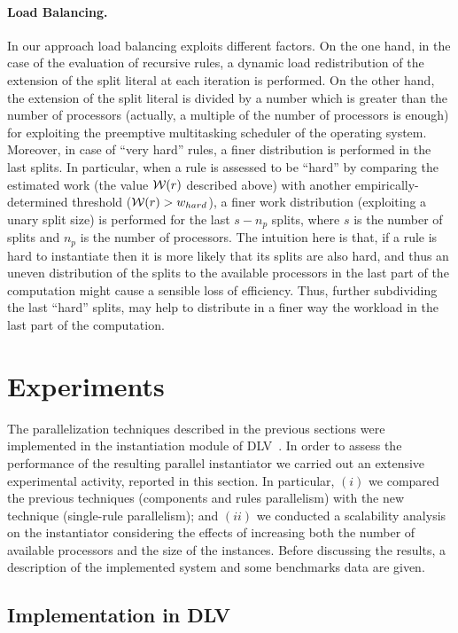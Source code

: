 \documentclass[preprint]{tlp}
\newcommand{\dlv}{{\sc DLV}\xspace}
\newcommand{\w}[1]{\ensuremath{{\cal W}(#1)}\xspace }
\begin{document}
\paragraph{Load Balancing.} In our approach load balancing exploits different factors.
On the one hand, in the case of the evaluation of recursive rules, a dynamic load redistribution
of the extension of the split literal at each iteration is performed.
On the other hand, the extension of the split literal is divided by a number which
is greater than the number of processors (actually, a multiple of the number of processors is enough)
for exploiting the preemptive multitasking scheduler of the operating system.
Moreover, in case of ``very hard'' rules, a finer distribution is performed in the last splits.
 In particular, when a rule is assessed to be ``hard''
by comparing the estimated work (the value $\w{r}$ described above) with another empirically-determined threshold ($\w{r}>w_{hard}$),
a finer work distribution (exploiting a unary split size) is performed for the last $s-n_{p}$ splits,
where $s$ is the number of splits and $n_{p}$ is the number of processors.
The intuition here is that, if a rule is hard to instantiate then
it is more likely that its splits are also hard, and thus
an uneven distribution of the splits to the available processors
in the last part of the computation might cause a sensible loss of efficiency.
Thus, further subdividing the last ``hard'' splits, may help to distribute in a finer way
the workload in the last part of the computation.

\section{Experiments}\label{sec:experiments}

The parallelization techniques described in the previous sections
were implemented in the instantiation module of DLV~\cite{leon-etal-2002-dlv}.
In order to assess the performance of the resulting parallel instantiator
we carried out an extensive experimental activity, reported in this section.
In particular, $(i)$
we compared the previous techniques (components and rules parallelism) with the new technique
(single-rule parallelism); and $(ii)$ we conducted
a scalability analysis on the instantiator considering  the effects of increasing both the number of available processors
and the size of the instances. Before discussing the results, a description of
the implemented system and some benchmarks data are given.

\subsection{Implementation in \dlv}
\end{document}
